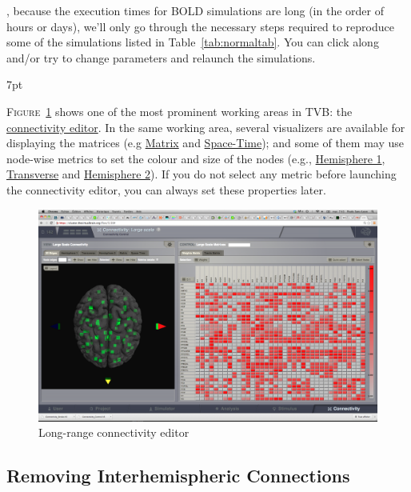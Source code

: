 \documentclass{tufte-handout}
\newenvironment{blah}{%
  \def\FrameCommand{%
    \hspace{1pt}%
    {\color{DarkOrange}\vrule width 2pt}%
    {\color{PeachPuff}\vrule width 4pt}%
    \colorbox{PeachPuff}%
  }%
  \MakeFramed{\advance\hsize-\width\FrameRestore}%
  \noindent\hspace{-4.55pt}%
  \begin{adjustwidth}{}{7pt}%
  \vspace{2pt}\vspace{2pt}%
}
{%
  \vspace{2pt}\end{adjustwidth}\endMakeFramed%
}
\begin{document}
, because the execution times for BOLD simulations
are long (in the order of hours or days), we'll only go through the necessary
steps required to reproduce some of the simulations listed in
Table~\ref{tab:normaltab}. You can click along and/or try to change
parameters and relaunch the simulations.


\begin{blah}
\textsc{Figure}~\ref{fig:fig} shows one of the most prominent working areas in
\textsc{TVB}: the \underline{connectivity editor}. In the same working area,  several
visualizers are available for displaying the matrices (e.g \underline{Matrix} and \underline{Space-Time}); and some of them may use node-wise
metrics to set the colour and size of the nodes (e.g., \underline{Hemisphere 1}, \underline{Transverse} and \underline{Hemisphere 2}). If you do not select any
metric before launching the connectivity editor, you can always set these
properties later.
\end{blah}

\begin{figure}[h]
  \includegraphics[width=\linewidth]{Handout_UI_ModellingStructuralLesions_ConnectivityArea}%
  \caption{Long-range connectivity editor}%
  \label{fig:fig}%
\end{figure}


\newpage
\subsection{Removing Interhemispheric Connections}\label{sec:steps}
\end{document}
